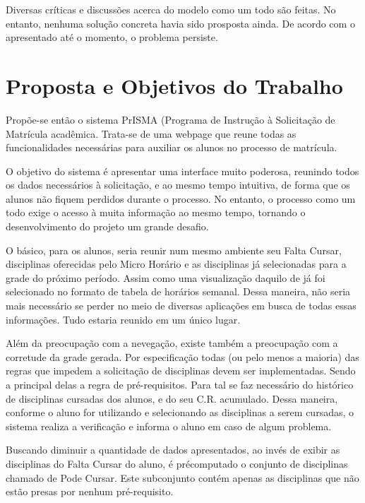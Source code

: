 \documentclass[graduacao,brazil]{ThesisPUC}
\begin{document}
Diversas cr\'{i}ticas e discussões acerca do modelo como um todo s\~{a}o feitas. No entanto, nenhuma solu\c{c}\~{a}o concreta havia sido prosposta ainda. De acordo com o apresentado at\'{e} o momento, o problema persiste.


\chapter{Proposta e Objetivos do Trabalho}

Propõe-se ent\~{a}o o sistema PrISMA (Programa de Instru\c{c}\~{a}o \`{a} Solicita\c{c}\~{a}o de Matr\'{i}cula acad\^{e}mica. Trata-se de uma webpage que reune todas as funcionalidades necess\'{a}rias para auxiliar os alunos no processo de matr\'{i}cula.

O objetivo do sistema \'{e} apresentar uma interface muito poderosa, reunindo todos os dados necess\'{a}rios \`{a} solicita\c{c}\~{a}o, e ao mesmo tempo intuitiva, de forma que os alunos n\~{a}o fiquem perdidos durante o processo. No entanto, o processo como um todo exige o acesso \`{a} muita informa\c{c}\~{a}o ao mesmo tempo, tornando o desenvolvimento do projeto um grande desafio.

O b\'{a}sico, para os alunos, seria reunir num mesmo ambiente seu Falta Cursar, disciplinas oferecidas pelo Micro Hor\'{a}rio e as disciplinas j\'{a} selecionadas para a grade do pr\'{o}ximo per\'{i}odo. Assim como uma visualiza\c{c}\~{a}o daquilo de j\'{a} foi selecionado no formato de tabela de hor\'{a}rios semanal. Dessa maneira, n\~{a}o seria mais necess\'{a}rio se perder no meio de diversas aplica\c{c}ões em busca de todas essas informa\c{c}ões. Tudo estaria reunido em um \'{u}nico lugar.

Al\'{e}m da preocupa\c{c}\~{a}o com a nevega\c{c}\~{a}o, existe tamb\'{e}m a preocupa\c{c}\~{a}o com a corretude da grade gerada. Por especifica\c{c}\~{a}o todas (ou pelo menos a maioria) das regras que impedem a solicita\c{c}\~{a}o de disciplinas devem ser implementadas. Sendo a principal delas a regra de pr\'{e}-requisitos. Para tal se faz necess\'{a}rio do hist\'{o}rico de disciplinas cursadas dos alunos, e do seu C.R. acumulado. Dessa maneira, conforme o aluno for utilizando e selecionando as disciplinas a serem cursadas, o sistema realiza a verifica\c{c}\~{a}o e informa o aluno em caso de algum problema.

Buscando diminuir a quantidade de dados apresentados, ao inv\'{e}s de exibir as disciplinas do Falta Cursar do aluno, \'{e} pr\'{e}computado o conjunto de disciplinas chamado de Pode Cursar. Este subconjunto cont\'{e}m apenas as disciplinas que n\~{a}o est\~{a}o presas por nenhum pr\'{e}-requisito. 
\end{document}
